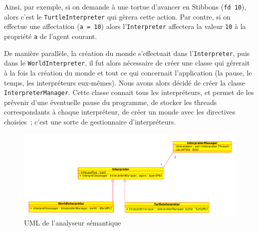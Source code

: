 Ainsi, par exemple, si on demande à une tortue d'avancer en Stibbons (\verb|fd 10|), alors c'est le \verb|TurtleInterpreter| qui gèrera cette action.
Par contre, si on effectue une affectation (\verb|a = 10|) alors l'\verb|Interpreter| affectera la valeur \verb|10| à la propriété \verb|a| de l'agent courant.

De manière parallèle, la création du monde s'effectuait dans l'\verb|Interpreter|, puis dans le \verb|WorldInterpreter|, il fut alors nécessaire de créer une classe qui gérerait à la fois la création du monde et tout ce qui concernait l'application (la pause, le temps, les interpréteurs eux-mêmes). Nous avons alors décidé de créer la classe \verb|InterpreterManager|.
Cette classe connait tous les interpréteurs, et permet de les prévenir d'une éventuelle pause du programme, de stocker les threads correspondants à chaque interpréteur, de créer un monde avec les directives choisies~; c'est une sorte de gestionnaire d'interpréteurs.

\begin{figure}[h]
\caption{\label{interpreterUML} UML de l'analyseur sémantique}
\includegraphics[scale=0.5]{doc/report/uml/interpreterUML.png}
\end{figure}
